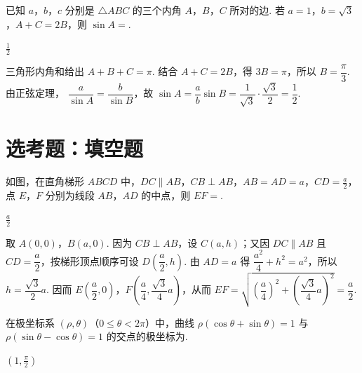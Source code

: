 \begin{problem}
已知 \(a\)，\(b\)，\(c\) 分别是 \(\triangle ABC\) 的三个内角 \(A\)，\(B\)，\(C\) 所对的边. 若 \(a = 1\)，\(b = \sqrt{3}\)，\(A + C = 2B\)，则 \(\sin A =\)\fillinblank{}.
\end{problem}

\begin{answer}
\(\frac{1}{2}\)
\end{answer}

\begin{solution}
三角形内角和给出 \(A+B+C=\pi\). 结合 \(A+C=2B\)，得 \(3B=\pi\)，所以 \(B=\dfrac\pi3\). 由正弦定理，
\(\dfrac{a}{\sin A}=\dfrac{b}{\sin B}\)，故
\(\sin A=\dfrac{a}{b}\sin B=\dfrac1{\sqrt3}\cdot\dfrac{\sqrt3}{2}=\dfrac12\).
\end{solution}

\section{选考题：填空题}

\begin{problem}
如图，在直角梯形 \(ABCD\) 中，\(DC \parallel AB\)，\(CB \perp AB\)，\(AB = AD = a\)，\(CD = \frac{a}{2}\)，点 \(E\)，\(F\) 分别为线段 \(AB\)，\(AD\) 的中点，则 \(EF =\)\fillinblank{}.

\end{problem}

\begin{answer}
\(\frac{a}{2}\)
\end{answer}

\begin{solution}
取 \(A(0,0)\)，\(B(a,0)\). 因为 \(CB\perp AB\)，设 \(C(a,h)\)；又因 \(DC\parallel AB\) 且 \(CD=\dfrac a2\)，按梯形顶点顺序可设 \(D(\dfrac a2,h)\). 由 \(AD=a\) 得
\(\dfrac{a^2}{4}+h^2=a^2\)，所以 \(h=\dfrac{\sqrt3}{2}a\). 因而
\(E(\dfrac a2,0)\)，\(F(\dfrac a4,\dfrac{\sqrt3}{4}a)\)，从而
\(EF=\sqrt{\left(\dfrac a4\right)^2+\left(\dfrac{\sqrt3}{4}a\right)^2}=\dfrac a2\).
\end{solution}

\begin{problem}
在极坐标系 \((\rho, \theta)\)（\(0 \leqslant \theta < 2\pi\)）中，曲线 \(\rho(\cos \theta + \sin \theta) = 1\) 与 \(\rho(\sin \theta - \cos \theta) = 1\) 的交点的极坐标为\fillinblank{}.
\end{problem}

\begin{answer}
\(\left(1, \frac{\pi}{2}\right)\)
\end{answer}

